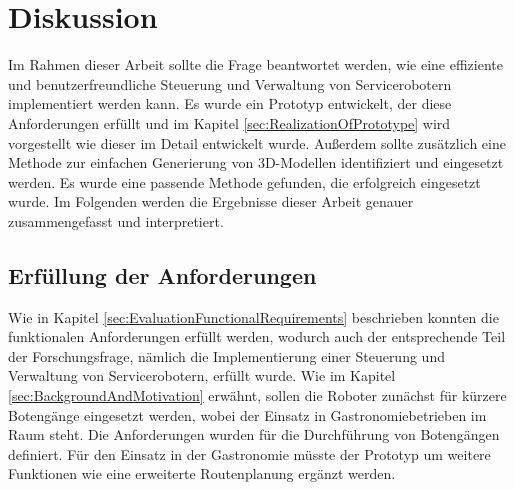 \newpage
\section{Diskussion}
Im Rahmen dieser Arbeit sollte die Frage beantwortet werden, wie eine effiziente und benutzerfreundliche Steuerung und Verwaltung von Servicerobotern implementiert werden kann. Es wurde ein Prototyp entwickelt, der diese Anforderungen erfüllt und im Kapitel \ref{sec:RealizationOfPrototype} wird vorgestellt wie dieser im Detail entwickelt wurde. Außerdem sollte zusätzlich eine Methode zur einfachen Generierung von 3D-Modellen identifiziert und eingesetzt werden. Es wurde eine passende Methode gefunden, die erfolgreich eingesetzt wurde. Im Folgenden werden die Ergebnisse dieser Arbeit genauer zusammengefasst und interpretiert.

\subsection{Erfüllung der Anforderungen}
Wie in Kapitel \ref{sec:EvaluationFunctionalRequirements} beschrieben konnten die funktionalen Anforderungen erfüllt werden, wodurch auch der entsprechende Teil der Forschungsfrage, nämlich die Implementierung einer Steuerung und Verwaltung von Servicerobotern, erfüllt wurde. Wie im Kapitel \ref{sec:BackgroundAndMotivation} erwähnt, sollen die Roboter zunächst für kürzere Botengänge eingesetzt werden, wobei der Einsatz in Gastronomiebetrieben im Raum steht. Die Anforderungen wurden für die Durchführung von Botengängen definiert. Für den Einsatz in der Gastronomie müsste der Prototyp um weitere Funktionen wie eine erweiterte Routenplanung ergänzt werden.

